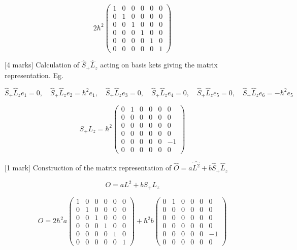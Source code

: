 \[ 
2\hbar^2 \begin{pmatrix} 1 & 0 & 0 & 0 & 0 & 0\\  0 & 1 & 0 & 0 & 0 & 0\\ 0 & 0 & 1 & 0 & 0 & 0\\ 0 & 0 & 0 & 1 & 0 & 0\\ 0 & 0 & 0 & 0 & 1 & 0\\ 0 & 0 & 0 & 0 & 0 & 1 \end{pmatrix}
\]

[4 marks] Calculation of \( \hat{S}_{+}\hat{L}_{z} \) acting on basis kets giving the matrix representation. Eg. 

\[
\hat{S}_{+}\hat{L}_{z}e_1 = 0, \quad \hat{S}_{+}\hat{L}_{z}e_2 = \hbar^2e_1, \quad \hat{S}_{+}\hat{L}_{z}e_3 = 0, \quad \hat{S}_{+}\hat{L}_{z}e_4 = 0, \quad \hat{S}_{+}\hat{L}_{z}e_5 = 0, \quad \hat{S}_{+}\hat{L}_{z}e_6 = -\hbar^2e_5 
\]

\[ 
S_{+}L_{z} = \hbar^2 \begin{pmatrix} 0 & 1 & 0 & 0 & 0 & 0\\ 0 & 0 & 0 & 0 & 0 & 0\\ 0 & 0 & 0 & 0 & 0 & 0\\ 0 & 0 & 0 & 0 & 0 & 0\\ 0 & 0 & 0 & 0 & 0 & -1\\ 0 & 0 & 0 & 0 & 0 & 0 \end{pmatrix}
\]

[1 mark] Construction of the matrix representation of \( \hat{O} = a\hat{L^{2}} + b\hat{S}_{+}\hat{L}_{z} \)

\[ O = a L^2 + b S_{+}L_z \]

\[
O = 2\hbar^2 a \begin{pmatrix} 1 & 0 & 0 & 0 & 0 & 0\\  0 & 1 & 0 & 0 & 0 & 0\\ 0 & 0 & 1 & 0 & 0 & 0\\ 0 & 0 & 0 & 1 & 0 & 0\\ 0 & 0 & 0 & 0 & 1 & 0\\ 0 & 0 & 0 & 0 & 0 & 1 \end{pmatrix} + \hbar^2 b \begin{pmatrix} 0 & 1 & 0 & 0 & 0 & 0\\ 0 & 0 & 0 & 0 & 0 & 0\\ 0 & 0 & 0 & 0 & 0 & 0\\ 0 & 0 & 0 & 0 & 0 & 0\\ 0 & 0 & 0 & 0 & 0 & -1\\ 0 & 0 & 0 & 0 & 0 & 0 \end{pmatrix}
\]

